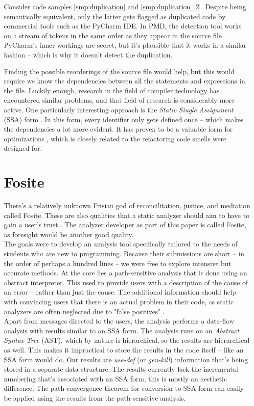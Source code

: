 \documentclass[a4paper, 11pt]{article}
\begin{document}
\begin{multicols*}{2}
Consider code samples \ref{smp:duplication} and \ref{smp:duplication_2}. Despite being semantically equivalent, only the latter gets flagged as duplicated code by commercial tools such as the PyCharm IDE. In PMD, the detection tool works on a stream of tokens in the same order as they appear in the source file \cite{pmd}. PyCharm's inner workings are secret, but it's plausible that it works in a similar fashion -- which is why it doesn't detect the duplication. 

Finding the possible reorderings of the source file would help, but this would require we know the dependencies between all the statements and expressions in the file.
Luckily enough, research in the field of compiler technology has encountered similar problems, and that field of research is considerably more active. One particularly interesting approach is the \textit{Static Single Assignment} (SSA) form \cite{equality}. In this form, every identifier only gets defined once -- which makes the dependencies a lot more evident. It has proven to be a valuable form for optimizations \cite{constant}, which is closely related to the refactoring code smells were designed for. 

\section{Fosite}

There's a relatively unknown Frisian god of reconcilitation, justice, and mediation called Fosite. These are also qualities that a static analyzer should aim to have to gain a user's trust \cite{coverity}. The analyzer developer as part of this paper is called Fosite, as foresight would be another good quality. \\

The goals were to develop an analysis tool specifically tailored to the needs of students who are new to programming. Because their submissions are short -- in the order of perhaps a hundred lines -- we were free to explore intensive but accurate methods. At the core lies a path-sensitive analysis that is done using an abstract interpreter. This used to provide users with a description of the cause of an error -- rather than just the cause. The additional information should help with convincing users that there is an actual problem in their code, as static analyzers are often neglected due to "false positives" \cite{coverity}. \\

Apart from messages directed to the users, the analysis performs a data-flow analysis with results similar to an SSA form. The analysis runs on an \textit{Abstract Syntax Tree} (AST), which by nature is hierarchical, so the results are hierarchical as well. This makes it impractical to store the results in the code itself -- like an SSA form would do. Our results are \textit{use-def} (or \textit{gen-kill}) information that's being stored in a separate data structure. The results currently lack the incremental numbering that's associated with an SSA form, this is mostly an aesthetic difference. The path-convergence theorem for conversion to SSA form can easily be applied using the results from the path-sensitive analysis. 


\end{multicols*}
\end{document}
